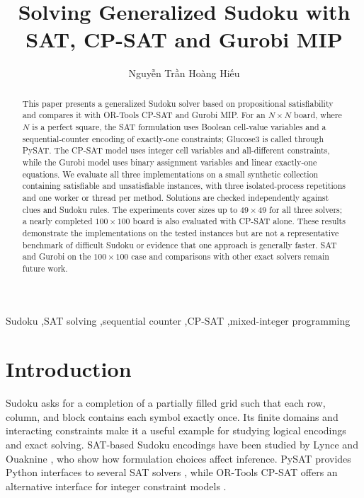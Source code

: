 \documentclass[a4paper,fleqn]{cas-sc}
\begin{document}
\title [mode=title]{Solving Generalized Sudoku with SAT, CP-SAT and Gurobi MIP}
\author[1]{Nguy{\~{\^e}}n Tr{\`{\^a}}n Ho{\`a}ng Hi{\'{\^e}}u}
\begin{abstract}
This paper presents a generalized Sudoku solver based on propositional satisfiability and compares it with OR-Tools CP-SAT and Gurobi MIP. For an \(N\times N\) board, where \(N\) is a perfect square, the SAT formulation uses Boolean cell-value variables and a sequential-counter encoding of exactly-one constraints; Glucose3 is called through PySAT. The CP-SAT model uses integer cell variables and all-different constraints, while the Gurobi model uses binary assignment variables and linear exactly-one equations. We evaluate all three implementations on a small synthetic collection containing satisfiable and unsatisfiable instances, with three isolated-process repetitions and one worker or thread per method. Solutions are checked independently against clues and Sudoku rules. The experiments cover sizes up to \(49\times49\) for all three solvers; a nearly completed \(100\times100\) board is also evaluated with CP-SAT alone. These results demonstrate the implementations on the tested instances but are not a representative benchmark of difficult Sudoku or evidence that one approach is generally faster. SAT and Gurobi on the \(100\times100\) case and comparisons with other exact solvers remain future work.
\end{abstract}
\begin{keywords}
Sudoku \sep SAT solving \sep sequential counter \sep CP-SAT \sep mixed-integer programming
\end{keywords}
\maketitle

\section{Introduction}
Sudoku asks for a completion of a partially filled grid such that each row, column, and block contains each symbol exactly once. Its finite domains and interacting constraints make it a useful example for studying logical encodings and exact solving. SAT-based Sudoku encodings have been studied by Lynce and Ouaknine \cite{lynce}, who show how formulation choices affect inference. PySAT provides Python interfaces to several SAT solvers \cite{pysat}, while OR-Tools CP-SAT offers an alternative interface for integer constraint models \cite{cpsat}.
\end{document}
